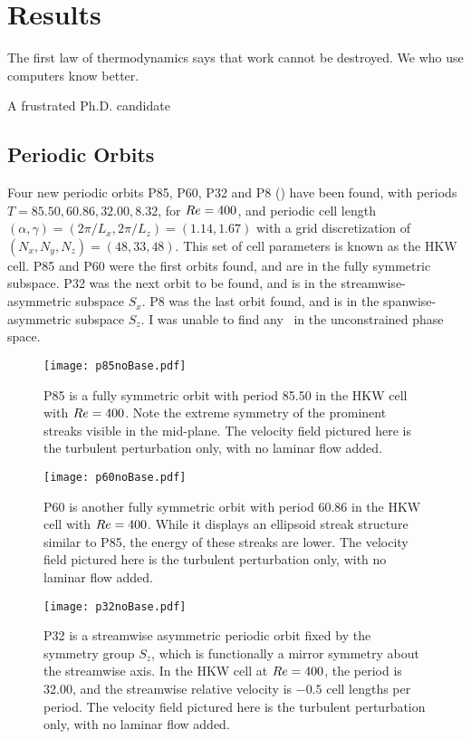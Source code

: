 \chapter{Results}
\epigraph{The first law of thermodynamics says that work cannot be destroyed. We who use computers know better.}{A frustrated Ph.D. candidate}

\section{Periodic Orbits}

Four new periodic orbits P85, P60, P32 and P8 () have been found, with periods $T= 85.50, 60.86, 32.00, 8.32$, for $Re = 400$, and periodic cell length $(\alpha,\gamma) = (2\pi/L_x,2\pi/L_z) = (1.14,1.67)$ with a grid discretization of $(N_x,N_y,N_z) = (48,33,48)$. This  set of cell parameters is known as the HKW cell. P85 and P60 were the first orbits found, and are in the fully symmetric subspace. P32 was the next orbit to be found, and is in the streamwise-asymmetric subspace $S_x$. P8 was the last orbit found, and is in the spanwise-asymmetric subspace $S_z$. I was unable to find any \ecs\ in the unconstrained phase space. 

\begin{figure}
\centerline{\texttt{[image: p85noBase.pdf]}}
\caption{P85 is a fully symmetric orbit with period 85.50 in the HKW cell with $Re=400$. Note the extreme symmetry of the prominent streaks visible in the mid-plane. The velocity field pictured here is the turbulent perturbation only, with no laminar flow added.}\label{fig:p85}
\end{figure}

\begin{figure}
\centerline{\texttt{[image: p60noBase.pdf]}}
\caption{P60 is another fully symmetric orbit with period 60.86 in the HKW cell with $Re = 400$. While it displays an ellipsoid streak structure similar to P85, the energy of these streaks are lower. The velocity field pictured here is the turbulent perturbation only, with no laminar flow added.}\label{fig:p60}
\end{figure}


\begin{figure}
\centerline{\texttt{[image: p32noBase.pdf]}}
\caption{P32 is a streamwise asymmetric periodic orbit fixed by the symmetry group $S_z$, which is functionally a mirror symmetry about the streamwise axis. In the HKW cell at $Re=400$, the period is 32.00, and the streamwise relative velocity is $-0.5$ cell lengths per period. The velocity field pictured here is the turbulent perturbation only, with no laminar flow added.}\label{fig:p32}
\end{figure}


